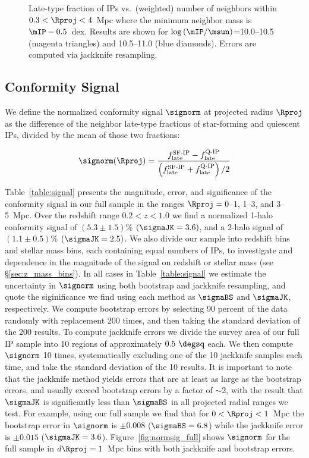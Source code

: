 \begin{figure}
  \epstrim{0.45in 0.1in 0.15in 0.3in}
  \caption{Late-type fraction of IPs vs.~(weighted) number of neighbors within {$0.3<\Rproj<4$~Mpc} where the minimum neighbor mass is $\mIP-0.5$~dex.
Results are shown for $\log\,(\mIP/\msun)$={10.0--10.5} (magenta triangles) and {10.5--11.0} (blue diamonds).
Errors are computed via jackknife resampling.
}
  \label{fig:latefrac_vs_environ}
\end{figure}


\subsection{Conformity Signal}\label{sec:signal}

We define the normalized conformity signal $\signorm$ at projected radius $\Rproj$ as the difference of the neighbor late-type fractions of star-forming and quiescent IPs, 
divided by the mean of those two fractions:

\begin{equation}
	\signorm(\Rproj) = \frac
	{ f^{\textrm{SF-IP}}_{\textrm{late}}-f^{\textrm{Q-IP}}_{\textrm{late}} }
	{ \left( f^{\textrm{SF-IP}}_{\textrm{late}}+f^{\textrm{Q-IP}}_{\textrm{late}} \right) /2}
\end{equation}

Table~\ref{table:signal} presents the magnitude, error, and significance of the conformity signal in our full sample in the ranges $\Rproj=0$--1, 1--3, and 3--5~Mpc.
Over the redshift range {$0.2<z<1.0$} we find a normalized 1-halo conformity signal of {$(5.3\pm1.5)$\%} $(\sigmaJK=3.6)$, and a 2-halo signal of {$(1.1\pm0.5)$\%} $(\sigmaJK=2.5)$.
We also divide our sample into redshift bins and stellar mass bins, each containing equal numbers of IPs, to investigate and dependence in the magnitude of the signal on redshift or stellar mass (see \S\ref{sec:z_mass_bins}).
In all cases in Table~\ref{table:signal} we estimate the uncertainty in $\signorm$ using both bootstrap and jackknife resampling, and quote the siginificance we find using each method as $\sigmaBS$ and $\sigmaJK$, respectively.
We compute bootstrap errors by selecting 90 percent of the data randomly with replacement 200 times, and then taking the standard deviation of the 200 results.
To compute jackknife errors we divide the survey area of our full IP sample into 10 regions of approximately $0.5~\degsq$ each.
We then compute $\signorm$ 10 times, systematically excluding one of the 10 jackknife samples each time, and take the standard deviation of the 10 results.
It is important to note that the jackknife method yields errors that are at least as large as the bootstrap errors, and usually exceed bootstrap errors by a factor of $\sim$2, with the result that $\sigmaJK$ is significantly less than $\sigmaBS$ in all projected radial ranges we test.
For example, using our full sample we find that for {$0<\Rproj<1$~Mpc} the bootstrap error in $\signorm$ is ${\pm0.008}$ ($\sigmaBS=6.8$) while the jackknife error is ${\pm0.015}$
($\sigmaJK=3.6$).
Figure~\ref{fig:normsig_full} shows $\signorm$ for the full sample in {$d\Rproj=1$~Mpc} bins with both jackknife and bootstrap errors.

